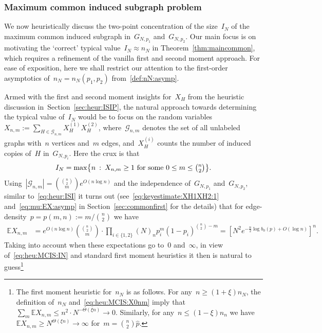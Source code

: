 \documentclass{article}
\newcommand{\E}{\mathbb{E}}
\newcommand{\cG}{\mathcal{G}}
\newcommand{\ps}{\hat{p}}
\newcommand\bigcpar[1]{\bigl\{#1\bigr\}}
\newcommand{\refS}[1]{Section~\ref{#1}}
\begin{document}
\subsubsection{Maximum common induced subgraph problem}\label{sec:heuristic:MCIS}
We now heuristically discuss the two-point concentration of the size~$I_N$ of the maximum common induced subgraph in~$G_{N,p_1}$ and~$G_{N,p_2}$. 
Our main focus is on motivating the `correct' typical value~$I_N \approx n_N$ in Theorem~\ref{thm:maincommon},   
which requires a refinement of the vanilla first and second moment approach. 
For ease of exposition, here we shall restrict our attention to the first-order asymptotics of~$n_N=n_N(p_1,p_2)$ from~\eqref{def:nN:asymp}. 


Armed with the first and second moment insights for~$X_H$ from the heuristic discussion in~\refS{sec:heur:ISIP},
the natural approach towards determining the typical value of~$I_N$ would be to focus 
on the random variables~$X_{n,m} := \sum_{H \in \cG_{n,m}}X^{(1)}_HX^{(2)}_H$, 
where~$\cG_{n,m}$ denotes the set of all unlabeled graphs with~$n$ vertices and~$m$ edges, and~$X^{(i)}_H$ counts the number of induced copies of~$H$ in~$G_{N,p_i}$.  
Here the crux is that 
\begin{equation}\label{eq:heu:MCIS:IN}
I_N = \max\bigcpar{ n \: : \: \text{$X_{n,m} \ge 1$ for some~$0 \le m \le \tbinom{n}{2}$}} . 
\end{equation}
Using~$|\cG_{n,m}|=\binom{\binom{n}{2}}{m} e^{O(n\log n)}$ and the independence of~$G_{N,p_1}$ and~$G_{N,p_2}$, similar to~\eqref{eq:heur:ISI} it turns out (see~\eqref{eq:keyestimate:XH1XH2:1} and~\eqref{eq:mu:EX:asymp} in Section~\ref{sec:commonfirst} for the details) 
that for edge-density~$p=p(m,n):=m/\binom{n}{2}$ we have 
\begin{equation}\label{eq:heu:MCIS:X0nm}
\begin{split}
\E X_{n,m} 
&= 
e^{O(n\log n)} \binom{\binom{n}{2}}{m} \cdot \prod_{i \in \{1,2\}} (N)_n p_i^m(1-p_i)^{\binom{n}{2}-m}
    =\left[N^2e^{-\frac{n}{2} \log {b_0}(p)+O(\log n)}\right]^n.
\end{split}
\end{equation}
Taking into account when these expectations go to~$0$ and~$\infty$, 
in view of~\eqref{eq:heu:MCIS:IN} and standard first moment heuristics it then is natural to guess\footnote{The first moment heuristic for~$n_N$ is as follows.  
For any~$n \ge (1+\xi)n_N$, the definition of~$n_N$ and~\eqref{eq:heu:MCIS:X0nm} imply that~$\sum_m\E X_{n,m} \le n^2 \cdot N^{-\Theta(\xi n)} \to 0$. 
Similarly, for any~$n \le (1-\xi)n_n$ we have~$\E X_{n,m} \ge N^{\Theta(\xi n)} \to \infty$ for~$m=\binom{n}{2}\ps$.} 
\end{document}
